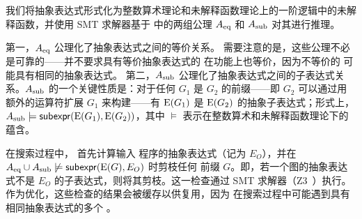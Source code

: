 我们将抽象表达式形式化为整数算术理论和未解释函数理论上的一阶逻辑中的未解释函数，并使用 SMT 求解器基于  中的两组公理 $A_\text{eq}$ 和 $A_\text{sub}$ 对其进行推理。

第一，$A_\text{eq}$ 公理化了抽象表达式之间的等价关系。
需要注意的是，这些公理不必是可靠的——并不要求具有等价抽象表达式的 \graphs 在功能上也等价，因为不等价的 \graphs 可能具有相同的抽象表达式。
第二，$A_\text{sub}$ 公理化了抽象表达式之间的子表达式关系。$A_\text{sub}$ 的一个关键性质是：对于任何 \graph $G_1$ 是 $G_2$ 的前缀——即 $G_2$ 可以通过用额外的运算符扩展 $G_1$ 来构建——有 $\mathrm{E}(G_1)$ 是 $\mathrm{E}(G_2)$ 的抽象子表达式；形式上，$A_\text{sub} \models \mathsf{subexpr}(\mathrm{E}(G_1), \mathrm{E}(G_2))$，其中 $\models$ 表示在整数算术和未解释函数理论下的蕴含。

在搜索过程中， 首先计算输入 \lax 程序的抽象表达式（记为 $E_O$），并在 $A_\text{eq} \cup A_\text{sub} \not\models \mathsf{subexpr}(\mathrm{E}(G),E_O)$ 时剪枝任何 \graph 前缀 $G$。即，若一个图的抽象表达式不是 $E_O$ 的子表达式，则将其剪枝。这一检查通过 SMT 求解器（Z3~\cite{z3}）执行。
作为优化，这些检查的结果会被缓存以供复用，因为 \sys 在搜索过程中可能遇到具有相同抽象表达式的多个 \graphs。


